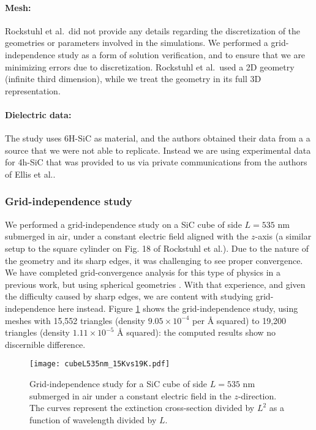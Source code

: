 \paragraph{Mesh:} Rockstuhl et al.\ did not provide any details regarding the discretization of the geometries or 
parameters involved in the simulations.
We performed a grid-independence study as a form of solution verification, and to ensure that we are 
minimizing errors due to discretization. Rockstuhl et al.\ used a 2D geometry (infinite third dimension), while we treat the geometry in its full 3D representation.

\paragraph{Dielectric data:} The study uses 6H-SiC as material, and the authors obtained their data from a a source that we
were not able to replicate. Instead we are using experimental data for 4h-SiC that was provided to us 
via private communications from the authors of Ellis et al.\cite{ellis2016}.  

\subsubsection{Grid-independence study}\label{sec:independence}

We performed a grid-independence study on a SiC cube of side $L=535$ nm submerged in air, under a 
constant electric field aligned with the $z$-axis (a similar setup to the square cylinder on Fig. 18 of 
Rockstuhl et al.\cite{rockstuhl2005}). 
Due to the nature of the geometry and its sharp edges, it was challenging to see proper convergence. 
We have completed grid-convergence analysis for this type of physics in a previous work, but using spherical geometries \cite{ClementiETal2019}. 
With that experience, and given the difficulty caused by sharp edges, we are content with studying grid-independence here instead.
Figure \ref{fig:cube535} shows the grid-independence study, using meshes with  15,552 triangles (density $9.05\times10^{-4}$ per $\text{\AA}$ squared)
 to 19,200 triangles (density $1.11\times10^{-5}$ $\text{\AA}$ squared):
 the computed results show no discernible difference.

\begin{figure}
    \centering
    \texttt{[image: cubeL535nm\_15Kvs19K.pdf]} 
    \caption{Grid-independence study for a SiC cube of side $L=535$ nm submerged in air under a constant 
    electric field in the $z$-direction. The curves represent the extinction cross-section divided by $L^2$ 
    as a function of wavelength divided by $L$.}
    \label{fig:cube535}
 \end{figure}

